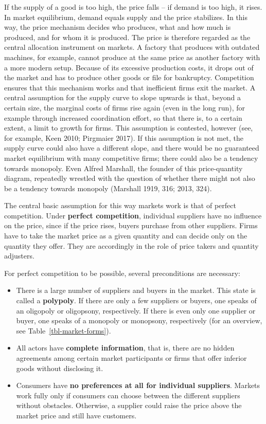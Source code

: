 \documentclass[
  british,
  a4paper,
  DIV=11,
  numbers=noendperiod,
  oneside,
  openany]{scrreprt}
\providecommand{\tightlist}{%
  \setlength{\itemsep}{0pt}\setlength{\parskip}{0pt}}
\begin{document}
If the supply of a good is too high, the price falls -- if demand is too
high, it rises. In market equilibrium, demand equals supply and the
price stabilizes. In this way, the price mechanism decides who produces,
what and how much is produced, and for whom it is produced. The price is
therefore regarded as the central allocation instrument on markets. A
factory that produces with outdated machines, for example, cannot
produce at the same price as another factory with a more modern setup.
Because of its excessive production costs, it drops out of the market
and has to produce other goods or file for bankruptcy. Competition
ensures that this mechanism works and that inefficient firms exit the
market. A central assumption for the supply curve to slope upwards is
that, beyond a certain size, the marginal costs of firms rise again
(even in the long run), for example through increased coordination
effort, so that there is, to a certain extent, a limit to growth for
firms. This assumption is contested, however (see, for example, Keen
2010; Pirgmaier 2017). If this assumption is not met, the supply curve
could also have a different slope, and there would be no guaranteed
market equilibrium with many competitive firms; there could also be a
tendency towards monopoly. Even Alfred Marshall, the founder of this
price-quantity diagram, repeatedly wrestled with the question of whether
there might not also be a tendency towards monopoly (Marshall 1919, 316;
2013, 324).

The central basic assumption for this way markets work is that of
perfect competition. Under \textbf{perfect competition}, individual
suppliers have no influence on the price, since if the price rises,
buyers purchase from other suppliers. Firms have to take the market
price as a given quantity and can decide only on the quantity they
offer. They are accordingly in the role of price takers and quantity
adjusters.

For perfect competition to be possible, several preconditions are
necessary:

\begin{itemize}
\tightlist
\item
  There is a large number of suppliers and buyers in the market. This
  state is called a \textbf{polypoly}. If there are only a few suppliers
  or buyers, one speaks of an oligopoly or oligopsony, respectively. If
  there is even only one supplier or buyer, one speaks of a monopoly or
  monopsony, respectively (for an overview, see
  Table~\ref{tbl-market-forms}).
\item
  All actors have \textbf{complete information}, that is, there are no
  hidden agreements among certain market participants or firms that
  offer inferior goods without disclosing it.
\item
  Consumers have \textbf{no preferences at all for individual
  suppliers}. Markets work fully only if consumers can choose between
  the different suppliers without obstacles. Otherwise, a supplier could
  raise the price above the market price and still have customers.
\end{itemize}
\end{document}
